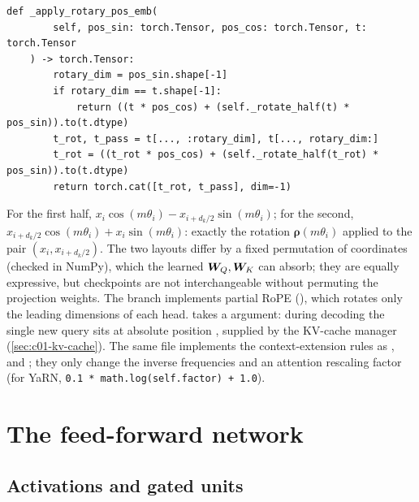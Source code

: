 \begin{implnote}[title={In the code: RoPE in OLMo-core}]
\begin{lstlisting}[caption={Excerpt from \texttt{repos/\allowbreak allenai\_\_OLMo-core/\allowbreak src/\allowbreak olmo\_core/\allowbreak nn/\allowbreak rope.py}},label={lst:c01-olmo-rope-apply}]
    def _apply_rotary_pos_emb(
        self, pos_sin: torch.Tensor, pos_cos: torch.Tensor, t: torch.Tensor
    ) -> torch.Tensor:
        rotary_dim = pos_sin.shape[-1]
        if rotary_dim == t.shape[-1]:
            return ((t * pos_cos) + (self._rotate_half(t) * pos_sin)).to(t.dtype)
        t_rot, t_pass = t[..., :rotary_dim], t[..., rotary_dim:]
        t_rot = ((t_rot * pos_cos) + (self._rotate_half(t_rot) * pos_sin)).to(t.dtype)
        return torch.cat([t_rot, t_pass], dim=-1)
\end{lstlisting}
For the first half, $x_i\cos(m\theta_i) - x_{i+d_k/2}\sin(m\theta_i)$; for the second,
$x_{i+d_k/2}\cos(m\theta_i) + x_i\sin(m\theta_i)$: exactly the rotation
$\bm{\rho}(m\theta_i)$ applied to the pair $(x_i, x_{i+d_k/2})$. The two layouts differ by a
fixed permutation of coordinates (checked in NumPy), which the learned $\bm{W}_Q, \bm{W}_K$ can
absorb; they are equally expressive, but checkpoints are not interchangeable without
permuting the projection weights. The  branch implements partial RoPE
(), which rotates only the leading dimensions of each head.
 takes a  argument: during decoding the single new query sits
at absolute position , supplied by the KV-cache manager
(\cref{sec:c01-kv-cache}). The same file implements the context-extension rules as
,  and
; they only change the inverse frequencies and an attention
rescaling factor (for YaRN, \texttt{0.1 * math.log(self.factor) + 1.0}).
\end{implnote}

\section{The feed-forward network}\label{sec:c01-ffn}

\subsection{Activations and gated units}\label{sec:c01-glu}

